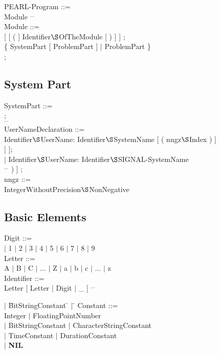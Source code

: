 PEARL-Program ::=\\
\x Module $^{...}$\\

Module ::=\\
 [ [ ( ] Identifier$\S $OfTheModule [ ) ] ] ;\\
\x \{ SystemPart [ ProblemPart ] $\mid$ ProblemPart \} \\
 ;

\subsection{System Part}   %

SystemPart ::= \\
 ;\\
\x {} $^{...}$\\

UserNameDeclaration ::=\\
\x Identifier$\S $UserName: Identifier$\S $SystemName [ ( nngz$\S $Index ) ]\\
\x \x [ $^*$ nngz$\S $Channel [ $^*$ nngz$\S $Position [ , nngz$\S $Width ] ] ];\\
\x $\mid$ Identifier$\S $UserName: Identifier$\S $SIGNAL-SystemName\\
\x \x [ ( Identifier$\S $ErrorNumber [ , Identifier$\S $ErrorNumber ] $^{...}$ ) ] ;\\

nngz ::= \\
\x IntegerWithoutPrecision$\S $NonNegative

\subsection{Basic Elements}    %

Digit ::=\\
 $\mid$ 1 $\mid$ 2 $\mid$ 3 $\mid$ 4 $\mid$ 5 $\mid$ 6 $\mid$ 7 $\mid$ 8 $\mid$ 9\\

Letter ::= \\
A $\mid$ B $\mid$ C $\mid$ ... $\mid$ Z $\mid$ a $\mid$ b $\mid$ c $\mid$ ... $\mid$ z\\

Identifier ::=\\
Letter [ Letter $\mid$ Digit $\mid$ \_ ] $^{...}$\\

\begin{tabbing}
\x $\mid$ \= BitStringConstant \= $\mid$ \= \kill
Constant ::= \> \> \> \\
          \> Integer           \> $\mid$ \> FloatingPointNumber\\
\x $\mid$ \> BitStringConstant \> $\mid$ \> CharacterStringConstant\\
\x $\mid$ \> TimeConstant      \> $\mid$ \> DurationConstant\\
\x $\mid$ \> {\bf NIL}         \> \> 
\end{tabbing}

